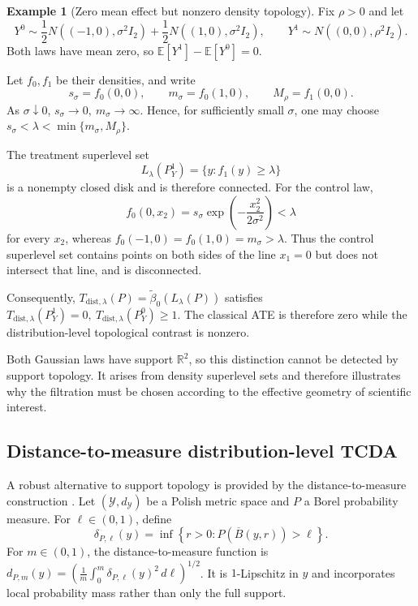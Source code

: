 \documentclass[11pt,a4paper]{article}
\theoremstyle{plain}
\theoremstyle{definition}
\newtheorem{example}[theorem]{Example}
\theoremstyle{remark}
\newcommand{\1}{\mathbbm{1}}
\begin{document}
\begin{example}[Zero mean effect but nonzero density topology]
\label{ex:zero-ate-density-topology}
Fix \(\rho>0\) and let
\[
Y^0
\sim
\frac12N((-1,0),\sigma^2I_2)
+
\frac12N((1,0),\sigma^2I_2),
\qquad
Y^1\sim N((0,0),\rho^2I_2).
\]
Both laws have mean zero, so \(\mathbb E[Y^1]-\mathbb E[Y^0]=0\).

Let \(f_0,f_1\) be their densities, and write
\[
s_\sigma=f_0(0,0),
\qquad
m_\sigma=f_0(1,0),
\qquad
M_\rho=f_1(0,0).
\]
As \(\sigma\downarrow0\), \(s_\sigma\longrightarrow0, \ m_\sigma\longrightarrow\infty\). Hence, for sufficiently small \(\sigma\), one may choose \(s_\sigma<\lambda<\min\{m_\sigma,M_\rho\}\).

The treatment superlevel set
\[
L_\lambda(P_Y^1)
=
\{y:f_1(y)\geq\lambda\}
\]
is a nonempty closed disk and is therefore connected. For the control law,
\[
f_0(0,x_2)
=
s_\sigma
\exp\left(-\frac{x_2^2}{2\sigma^2}\right)
<
\lambda
\]
for every \(x_2\), whereas \(f_0(-1,0)=f_0(1,0)=m_\sigma>\lambda\). Thus the control superlevel set contains points on both sides of the
line \(x_1=0\) but does not intersect that line, and is disconnected.

Consequently,
\(T_{\mathrm{dist},\lambda}(P) = \widetilde\beta_0(L_\lambda(P))\)
satisfies
\(T_{\mathrm{dist},\lambda}(P_Y^1)=0,
\  T_{\mathrm{dist},\lambda}(P_Y^0)\geq1\). The classical ATE is therefore zero while the distribution-level topological contrast is nonzero.
\end{example}

Both Gaussian laws have support \(\mathbb R^2\), so this distinction cannot be detected by support topology. It arises from density superlevel sets and therefore illustrates why the filtration must be chosen according to the effective geometry of scientific interest.



\subsection{Distance-to-measure distribution-level TCDA}
\label{subsec:dtm-distribution-tcda}

A robust alternative to support topology is provided by the
distance-to-measure construction \citep{chazalcohensteinermrigot2011,buchetetal2016}. Let
\((\mathcal Y,d_{\mathcal Y})\) be a Polish metric space and \(P\) a Borel probability measure. For \(\ell\in(0,1)\), define
\[
\delta_{P,\ell}(y)
=
\inf\left\{
r>0:P(\overline B(y,r))>\ell
\right\}.
\]
For \(m\in(0,1)\), the distance-to-measure function is
\(d_{P,m}(y) = \left(
\frac1m \int_0^m \delta_{P,\ell}(y)^2\,d\ell
\right)^{1/2}\). It is \(1\)-Lipschitz in \(y\) and incorporates local probability mass rather than only the full support.
\end{document}
